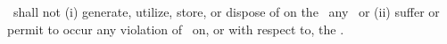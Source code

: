 \lessee\ shall not (i) generate, utilize, store, or dispose of on the \property\ any \hazardoussubstances\ or (ii) suffer or permit to occur any violation of \environmentallaw\ on, or with respect to, the \property.
